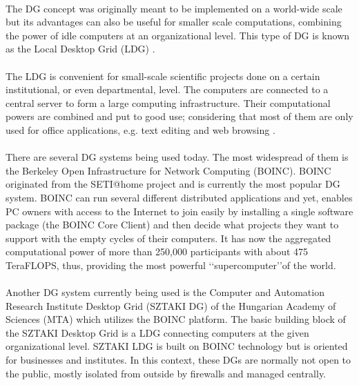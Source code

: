 \documentclass[10pt, twocolumn, letterpaper]{article}
\begin{document}
\paragraph{}
The DG concept was originally meant to be implemented on a world-wide scale but its advantages can also be useful for smaller scale computations, combining the power of idle computers at an organizational level. This type of DG is known as the Local Desktop Grid (LDG) \cite{balaton}.

\paragraph{}
The LDG is convenient for small-scale scientific projects done on a certain institutional, or even departmental, level. The computers are connected to a central server to form a large computing infrastructure. Their computational powers are combined and put to good use; considering that most of them are only used for office applications, e.g. text editing and web browsing \cite{desktopgrid.hu}.

\paragraph{}
There are several DG systems being used today. The most widespread of them is the Berkeley Open Infrastructure for Network Computing (BOINC). BOINC originated from the SETI@home project and is currently the most popular DG system. BOINC can run several different distributed applications and yet, enables PC owners with access to the Internet to join easily by installing a single software package (the BOINC Core Client) and then decide what projects they want to support with the empty cycles of their computers. It has now the aggregated computational power of more than 250,000 participants with about 475 TeraFLOPS, thus, providing the most powerful \lq\lq supercomputer\rq\rq of the world.

\paragraph{}
Another DG system currently being used is the Computer and Automation Research Institute Desktop Grid (SZTAKI DG) of the Hungarian Academy of Sciences (MTA) which utilizes the BOINC platform. The basic building block of the SZTAKI Desktop Grid is a LDG connecting computers at the given organizational level. SZTAKI LDG is built on BOINC technology but is oriented for businesses and institutes. In this context, these DGs are normally not open to the public, mostly isolated from outside by firewalls and managed centrally.
\end{document}
